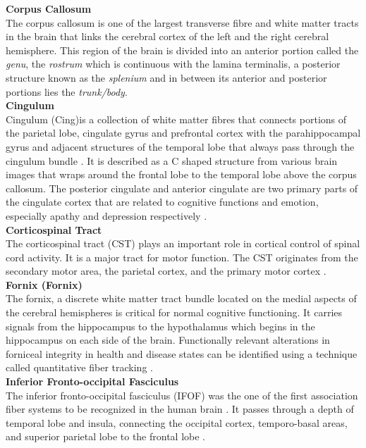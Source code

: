 \documentclass[../structure.tex]{subfiles}
\begin{document}
	\textbf{Corpus Callosum } \\
	The corpus callosum is one of the largest transverse fibre and white matter tracts in the brain that links the cerebral cortex of the left and the right cerebral hemisphere. This region of the brain is divided into an anterior portion called the \textit{genu}, the \textit{rostrum} which is continuous with the lamina terminalis, a posterior structure known as the \textit{splenium} and in between its anterior and posterior portions lies the \textit{trunk/body}.\\


		\textbf{Cingulum}  \\
		Cingulum (Cing)is a collection of white matter fibres that connects portions of the parietal lobe, cingulate gyrus and prefrontal cortex with the parahippocampal gyrus and adjacent structures of the temporal lobe that always pass through the cingulum bundle  \cite{Washington1994}. It is described as a C shaped structure from various brain images that wraps around the frontal lobe to the temporal lobe above the corpus callosum. The posterior cingulate and anterior cingulate are two primary parts of the cingulate cortex that are related to cognitive functions and emotion,  especially apathy and depression respectively \cite{JaredTanner2010}.\\
		
		
	\textbf{Corticospinal Tract } \\	
		The corticospinal tract (CST) plays an important role in cortical control of spinal cord activity. It is a major tract for motor function. The CST originates from the secondary motor area, the parietal cortex, and the primary motor cortex \cite{Seo2013}.\\
		
		
		\textbf{Fornix (Fornix)} \\		
	The fornix, a discrete white matter tract bundle located on the medial aspects of the cerebral hemispheres is critical for normal cognitive functioning. It carries signals from the hippocampus to the hypothalamus which begins in the hippocampus on each side of the brain. Functionally relevant alterations in forniceal integrity in health and disease states can be identified using a technique called quantitative fiber tracking \cite{Thomas2011}.\\

	
		\textbf{Inferior Fronto-occipital Fasciculus} \\		
		The inferior fronto-occipital fasciculus (IFOF)  was the one of the first association fiber systems to be recognized in the human brain \cite{Wu2016}. It passes through a depth of temporal lobe and insula, connecting the occipital cortex, temporo-basal areas, and superior parietal lobe to the frontal lobe \cite{PDD2015} . \\
\end{document}
